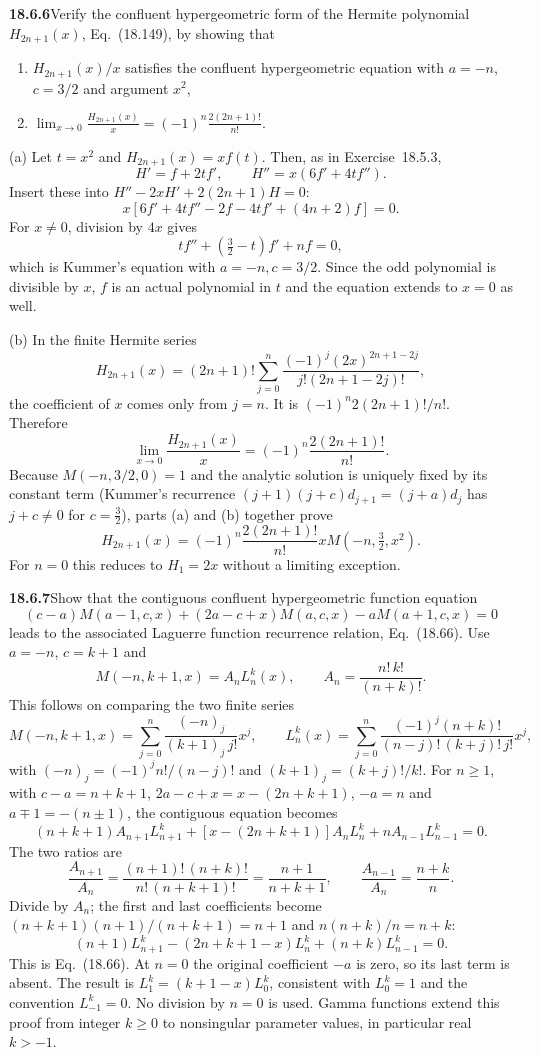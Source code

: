 \par\bigskip
\noindent\textbf{18.6.6}\quad Verify the confluent hypergeometric
form of the Hermite polynomial $H_{2n+1}(x)$, Eq.~(18.149), by
showing that
\begin{enumerate}
\item[(a)] $H_{2n+1}(x)/x$ satisfies the confluent hypergeometric
equation with $a=-n$, $c=3/2$ and argument $x^{2}$,
\item[(b)] $\displaystyle\lim_{x\to0}\frac{H_{2n+1}(x)}{x}
=(-1)^{n}\frac{2(2n+1)!}{n!}$.
\end{enumerate}
\solution
(a) Let $t=x^2$ and $H_{2n+1}(x)=xf(t)$.  Then, as in
Exercise~18.5.3,
\[
H'=f+2tf',\qquad H''=x(6f'+4tf'').
\]
Insert these into $H''-2xH'+2(2n+1)H=0$:
\[
x[6f'+4tf''-2f-4tf'+(4n+2)f]=0.
\]
For $x\ne0$, division by $4x$ gives
\[
\boxed{tf''+(\tfrac32-t)f'+nf=0},
\]
which is Kummer's equation with $a=-n,c=3/2$.
Since the odd polynomial is divisible by $x$, $f$ is an actual
polynomial in $t$ and the equation extends to $x=0$ as well.

(b) In the finite Hermite series
\[
H_{2n+1}(x)=(2n+1)!\sum_{j=0}^n
 \frac{(-1)^j(2x)^{2n+1-2j}}{j!(2n+1-2j)!},
\]
the coefficient of $x$ comes only from $j=n$.  It is
$(-1)^n2(2n+1)!/n!$.  Therefore
\[
\lim_{x\to0}\frac{H_{2n+1}(x)}x
 =\boxed{(-1)^n\frac{2(2n+1)!}{n!}}.
\]
Because $M(-n,3/2,0)=1$ and the analytic solution is uniquely
fixed by its constant term (Kummer's recurrence
$(j+1)(j+c)d_{j+1}=(j+a)d_j$ has $j+c\ne0$ for $c=\frac32$),
parts (a) and (b) together prove
\[
H_{2n+1}(x)=(-1)^n\frac{2(2n+1)!}{n!}
             xM(-n,\tfrac32,x^2).
\]
For $n=0$ this reduces to $H_1=2x$ without a limiting exception.

\par\bigskip
\noindent\textbf{18.6.7}\quad Show that the contiguous confluent
hypergeometric function equation
\[
(c-a)M(a-1,c,x)+(2a-c+x)M(a,c,x)-aM(a+1,c,x)=0
\]
leads to the associated Laguerre function recurrence relation,
Eq.~(18.66).
\solution
Use $a=-n$, $c=k+1$ and
\[
M(-n,k+1,x)=A_nL_n^k(x),\qquad
 A_n=\frac{n!\,k!}{(n+k)!}.
\]
This follows on comparing the two finite series
\[
M(-n,k+1,x)=\sum_{j=0}^n\frac{(-n)_j}{(k+1)_j\,j!}x^j,\qquad
L_n^k(x)=\sum_{j=0}^n\frac{(-1)^j(n+k)!}{(n-j)!\,(k+j)!\,j!}x^j,
\]
with $(-n)_j=(-1)^jn!/(n-j)!$ and $(k+1)_j=(k+j)!/k!$.
For $n\ge1$, with $c-a=n+k+1$, $2a-c+x=x-(2n+k+1)$, $-a=n$ and
$a\mp1=-(n\pm1)$, the contiguous equation becomes
\[
(n+k+1)A_{n+1}L_{n+1}^k
 +[x-(2n+k+1)]A_nL_n^k+nA_{n-1}L_{n-1}^k=0.
\]
The two ratios are
\[
\frac{A_{n+1}}{A_n}=\frac{(n+1)!\,(n+k)!}{n!\,(n+k+1)!}
=\frac{n+1}{n+k+1},\qquad
\frac{A_{n-1}}{A_n}=\frac{n+k}{n}.
\]
Divide by $A_n$; the first and last coefficients become
$(n+k+1)(n+1)/(n+k+1)=n+1$ and $n(n+k)/n=n+k$:
\[
\boxed{(n+1)L_{n+1}^k-(2n+k+1-x)L_n^k
                         +(n+k)L_{n-1}^k=0}.
\]
This is Eq.~(18.66).  At $n=0$ the original coefficient $-a$
is zero, so its last term is absent.  The result is
$L_1^k=(k+1-x)L_0^k$, consistent with $L_0^k=1$ and the
convention $L_{-1}^k=0$.  No division by $n=0$ is used.
Gamma functions extend this proof from integer $k\ge0$ to
nonsingular parameter values, in particular real $k>-1$.

